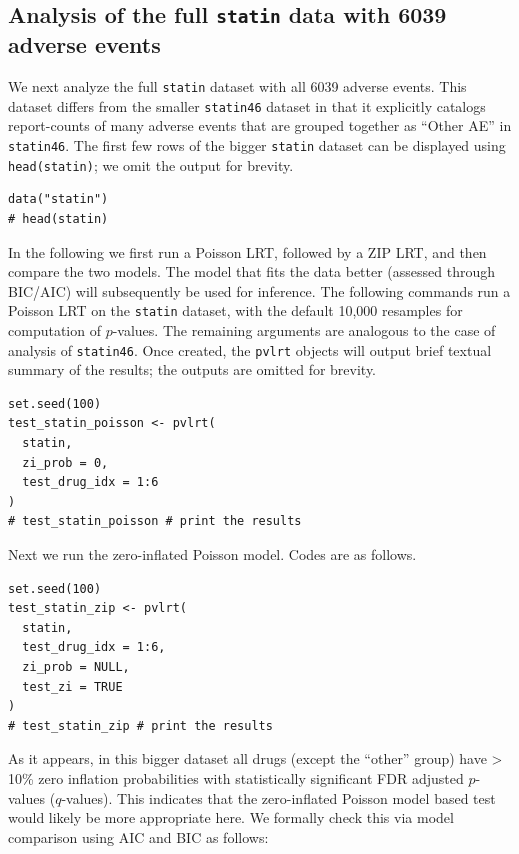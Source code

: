 \hypertarget{analysis-of-the-full-statin-data-with-6039-adverse-events}{%
\subsection{\texorpdfstring{Analysis of the full \texttt{statin} data with 6039 adverse events}{Analysis of the full statin data with 6039 adverse events}}\label{analysis-of-the-full-statin-data-with-6039-adverse-events}}

We next analyze the full \texttt{statin} dataset with all 6039 adverse events. This dataset differs from the smaller \texttt{statin46} dataset in that it explicitly catalogs report-counts of many adverse events that are grouped together as ``Other AE'' in \texttt{statin46}. The first few rows of the bigger \texttt{statin} dataset can be displayed using \texttt{head(statin)}; we omit the output for brevity.

\begin{verbatim}
data("statin")
# head(statin)
\end{verbatim}

In the following we first run a Poisson LRT, followed by a ZIP LRT, and then compare the two models. The model that fits the data better (assessed through BIC/AIC) will subsequently be used for inference. The following commands run a Poisson LRT on the \texttt{statin} dataset, with the default 10,000 resamples for computation of \(p\)-values. The remaining arguments are analogous to the case of analysis of \texttt{statin46}. Once created, the \texttt{pvlrt} objects will output brief textual summary of the results; the outputs are omitted for brevity.

\begin{verbatim}
set.seed(100)
test_statin_poisson <- pvlrt(
  statin,
  zi_prob = 0,
  test_drug_idx = 1:6
)
# test_statin_poisson # print the results
\end{verbatim}

\noindent Next we run the zero-inflated Poisson model. Codes are as follows.

\begin{verbatim}
set.seed(100)
test_statin_zip <- pvlrt(
  statin,
  test_drug_idx = 1:6,
  zi_prob = NULL,
  test_zi = TRUE
)
# test_statin_zip # print the results
\end{verbatim}

\noindent As it appears, in this bigger dataset all drugs (except the ``other'' group) have \textgreater{} 10\% zero inflation probabilities with statistically significant FDR adjusted \(p\)-values (\(q\)-values). This indicates that the zero-inflated Poisson model based test would likely be more appropriate here. We formally check this via model comparison using AIC and BIC as follows:

